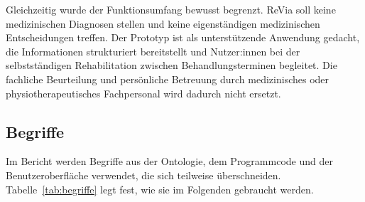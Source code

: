Gleichzeitig wurde der Funktionsumfang bewusst begrenzt. ReVia soll keine medizinischen Diagnosen stellen und keine eigenständigen medizinischen Entscheidungen treffen. Der Prototyp ist als unterstützende Anwendung gedacht, die Informationen strukturiert bereitstellt und Nutzer:innen bei der selbstständigen Rehabilitation zwischen Behandlungsterminen begleitet. Die fachliche Beurteilung und persönliche Betreuung durch medizinisches oder physiotherapeutisches Fachpersonal wird dadurch nicht ersetzt.

\subsection{Begriffe}

Im Bericht werden Begriffe aus der Ontologie, dem Programmcode und der Benutzeroberfläche verwendet, die sich teilweise überschneiden. Tabelle~\ref{tab:begriffe} legt fest, wie sie im Folgenden gebraucht werden.

